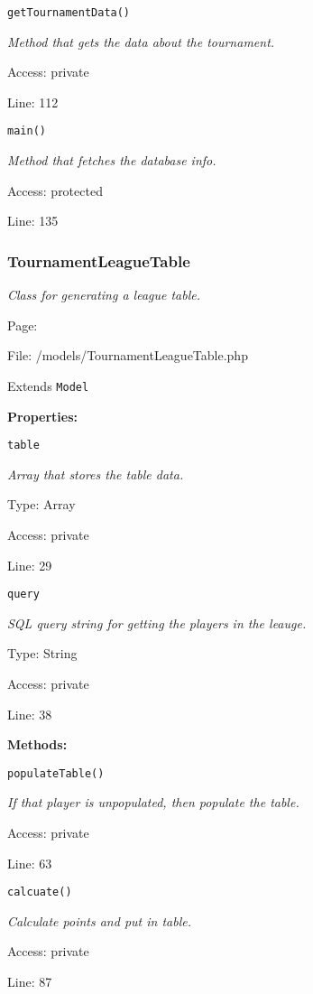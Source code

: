\texttt{getTournamentData()}

{\scriptsize
\textit{Method that gets the data about the tournament.}

Access: private

Line: 112

}

\texttt{main()}

{\scriptsize
\textit{Method that fetches the database info.}

Access: protected

Line: 135

}

\subsubsection{TournamentLeagueTable}\label{TournamentLeagueTable.php.doc}
\textit{Class for generating a league table.}

Page: \pageref{TournamentLeagueTable.php}

File: /models/TournamentLeagueTable.php

Extends \texttt{Model}

\textbf{Properties:}

\texttt{table}

{\scriptsize
\textit{Array that stores the table data.}

Type: Array

Access: private

Line: 29

}
\texttt{query}

{\scriptsize
\textit{SQL query string for getting the players in the leauge.}

Type: String

Access: private

Line: 38

}
\textbf{Methods:}

\texttt{populateTable()}

{\scriptsize
\textit{If that player is unpopulated, then populate the table.}

Access: private

Line: 63

}

\texttt{calcuate()}

{\scriptsize
\textit{Calculate points and put in table.}

Access: private

Line: 87

}

